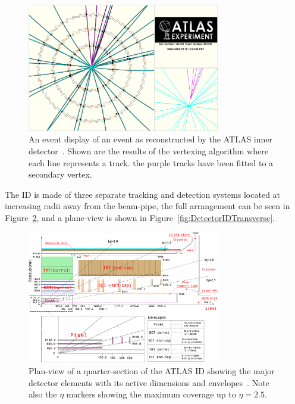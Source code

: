 \begin{figure}[htbp]
  \centering
  \includegraphics[width=0.75\textwidth]{PartDetector/Diagrams/fig_14.eps}
  \caption[An event display of an event as reconstructed by the ATLAS inner detector.]{An event display of an event as reconstructed by the ATLAS inner detector~\cite{Detector:ATLASExperimentGeneral}. Shown are the results of the vertexing algorithm where each line represents a track. the purple tracks have been fitted to a secondary vertex.}
  \label{fig:DetectorEventDisplayID}
\end{figure}

The ID is made of three separate tracking and detection systems located at increasing radii away from the beam-pipe, the full arrangement can be seen in Figure~\ref{fig:DetectorIDQuarter}, and a plane-view is shown in Figure~\ref{fig:DetectorIDTransverse}.

\begin{figure}
  \centering
    \includegraphics[width=0.75\textwidth]{PartDetector/Diagrams/Detector_ID_QuarterView.eps}
    \caption[Plan-view of a quarter-section of the ATLAS ID showing the major detector elements with its active dimensions and envelopes.]{Plan-view of a quarter-section of the ATLAS ID showing the major detector elements with its active dimensions and envelopes~\cite{Detector:ATLASExperimentGeneral}. Note also the $\eta$ markers showing the maximum coverage up to $\eta=2.5$.}
  \label{fig:DetectorIDQuarter}
\end{figure}
  
